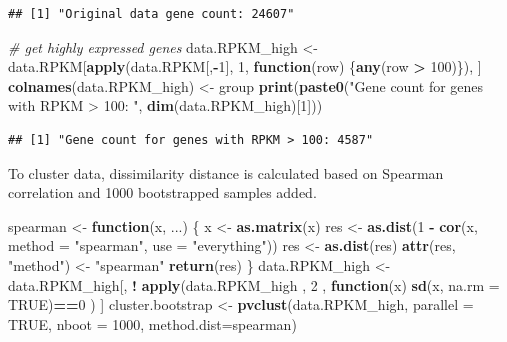 \documentclass[]{article}
\newenvironment{Shaded}{\begin{snugshade}}{\end{snugshade}}
\newcommand{\KeywordTok}[1]{\textcolor[rgb]{0.13,0.29,0.53}{\textbf{#1}}}
\newcommand{\DataTypeTok}[1]{\textcolor[rgb]{0.13,0.29,0.53}{#1}}
\newcommand{\DecValTok}[1]{\textcolor[rgb]{0.00,0.00,0.81}{#1}}
\newcommand{\StringTok}[1]{\textcolor[rgb]{0.31,0.60,0.02}{#1}}
\newcommand{\CommentTok}[1]{\textcolor[rgb]{0.56,0.35,0.01}{\textit{#1}}}
\newcommand{\OtherTok}[1]{\textcolor[rgb]{0.56,0.35,0.01}{#1}}
\newcommand{\ControlFlowTok}[1]{\textcolor[rgb]{0.13,0.29,0.53}{\textbf{#1}}}
\newcommand{\OperatorTok}[1]{\textcolor[rgb]{0.81,0.36,0.00}{\textbf{#1}}}
\newcommand{\NormalTok}[1]{#1}
\begin{document}
\begin{verbatim}
## [1] "Original data gene count: 24607"
\end{verbatim}

\begin{Shaded}
\begin{Highlighting}[]
\CommentTok{# get highly expressed genes}
\NormalTok{data.RPKM_high <-}\StringTok{ }\NormalTok{data.RPKM[}\KeywordTok{apply}\NormalTok{(data.RPKM[,}\OperatorTok{-}\DecValTok{1}\NormalTok{], }\DecValTok{1}\NormalTok{, }\ControlFlowTok{function}\NormalTok{(row) \{}\KeywordTok{any}\NormalTok{(row }\OperatorTok{>}\StringTok{ }\DecValTok{100}\NormalTok{)\}), ]}
\KeywordTok{colnames}\NormalTok{(data.RPKM_high) <-}\StringTok{ }\NormalTok{group}
\KeywordTok{print}\NormalTok{(}\KeywordTok{paste0}\NormalTok{(}\StringTok{"Gene count for genes with RPKM > 100: "}\NormalTok{, }\KeywordTok{dim}\NormalTok{(data.RPKM_high)[}\DecValTok{1}\NormalTok{]))}
\end{Highlighting}
\end{Shaded}

\begin{verbatim}
## [1] "Gene count for genes with RPKM > 100: 4587"
\end{verbatim}

To cluster data, dissimilarity distance is calculated based on Spearman
correlation and 1000 bootstrapped samples added.

\begin{Shaded}
\begin{Highlighting}[]
\NormalTok{spearman <-}\StringTok{ }\ControlFlowTok{function}\NormalTok{(x, ...) \{}
\NormalTok{    x <-}\StringTok{ }\KeywordTok{as.matrix}\NormalTok{(x)}
\NormalTok{    res <-}\StringTok{ }\KeywordTok{as.dist}\NormalTok{(}\DecValTok{1} \OperatorTok{-}\StringTok{ }\KeywordTok{cor}\NormalTok{(x, }\DataTypeTok{method =} \StringTok{"spearman"}\NormalTok{, }\DataTypeTok{use =} \StringTok{"everything"}\NormalTok{))}
\NormalTok{    res <-}\StringTok{ }\KeywordTok{as.dist}\NormalTok{(res)}
    \KeywordTok{attr}\NormalTok{(res, }\StringTok{"method"}\NormalTok{) <-}\StringTok{ "spearman"}
    \KeywordTok{return}\NormalTok{(res)}
\NormalTok{\}}
\NormalTok{data.RPKM_high <-}\StringTok{ }\NormalTok{data.RPKM_high[, }\OperatorTok{!}\StringTok{ }\KeywordTok{apply}\NormalTok{(data.RPKM_high , }\DecValTok{2}\NormalTok{ ,}
                                           \ControlFlowTok{function}\NormalTok{(x) }\KeywordTok{sd}\NormalTok{(x, }\DataTypeTok{na.rm =} \OtherTok{TRUE}\NormalTok{)}\OperatorTok{==}\DecValTok{0}\NormalTok{ ) ]}
\NormalTok{cluster.bootstrap <-}\StringTok{ }\KeywordTok{pvclust}\NormalTok{(data.RPKM_high, }\DataTypeTok{parallel =} \OtherTok{TRUE}\NormalTok{, }\DataTypeTok{nboot =} \DecValTok{1000}\NormalTok{,}
                             \DataTypeTok{method.dist=}\NormalTok{spearman)}
\end{Highlighting}
\end{Shaded}
\end{document}
